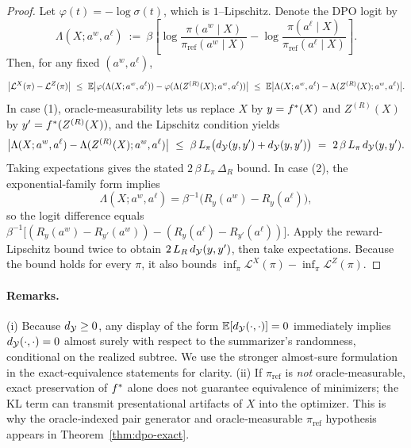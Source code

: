 \begin{proof}
Let $\varphi(t)=-\log\sigma(t)$, which is $1$–Lipschitz. Denote the DPO logit by
\[
\Lambda(X;a^w,a^\ell)\ :=\ \beta\!\left[\log\frac{\pi(a^w\mid X)}{\pi_{\mathrm{ref}}(a^w\mid X)}-\log\frac{\pi(a^\ell\mid X)}{\pi_{\mathrm{ref}}(a^\ell\mid X)}\right].
\]
Then, for any fixed $(a^w,a^\ell)$,
\[
\big|\mathcal L^{X}(\pi)-\mathcal L^{Z}(\pi)\big|
\ \le\ \E\big|\varphi(\Lambda(X;a^w,a^\ell))-\varphi(\Lambda(Z^{(R)}(X);a^w,a^\ell))\big|
\ \le\ \E\big|\Lambda(X;a^w,a^\ell)-\Lambda(Z^{(R)}(X);a^w,a^\ell)\big|.
\]
In case (1), oracle‑measurability lets us replace $X$ by $y=f^{\ast}(X)$ and $Z^{(R)}(X)$ by $y'=f^{\ast}(Z^{(R)}(X))$, and the Lipschitz condition yields
\[
\big|\Lambda(X;a^w,a^\ell)-\Lambda(Z^{(R)}(X);a^w,a^\ell)\big|\ \le\ \beta\,L_\pi\big(\metric(y,y')+\metric(y,y')\big)\ =\ 2\,\beta\,L_\pi\,\metric(y,y').
\]
Taking expectations gives the stated $2\,\beta\,L_\pi\,\Delta_R$ bound. In case (2), the exponential-family form implies
\[
\Lambda(X;a^w,a^\ell)=\beta^{-1}\!\big(R_y(a^w)-R_y(a^\ell)\big),
\]
so the logit difference equals $\beta^{-1}\!\big[(R_y(a^w)-R_{y'}(a^w))-(R_y(a^\ell)-R_{y'}(a^\ell))\big]$. Apply the reward-Lipschitz bound twice to obtain $2\,L_R\,d_{\mathcal{Y}}(y,y')$, then take expectations. Because the bound holds for every $\pi$, it also bounds $\inf_\pi \mathcal L^{X}(\pi)-\inf_\pi \mathcal L^{Z}(\pi)$.
\end{proof}

\paragraph{Remarks.} (i) Because $d_{\mathcal{Y}}\ge0$, any display of the form $\mathbb{E}[d_{\mathcal{Y}}(\cdot,\cdot)]=0$ immediately implies $d_{\mathcal{Y}}(\cdot,\cdot)=0$ almost surely with respect to the summarizer’s randomness, conditional on the realized subtree. We use the stronger almost‑sure formulation in the exact‐equivalence statements for clarity. (ii) If $\pi_{\mathrm{ref}}$ is \emph{not} oracle‑measurable, exact preservation of $f^{\ast}$ alone does not guarantee equivalence of minimizers; the KL term can transmit presentational artifacts of $X$ into the optimizer. This is why the oracle‑indexed pair generator and oracle‑measurable $\pi_{\mathrm{ref}}$ hypothesis appears in Theorem~\ref{thm:dpo-exact}.
